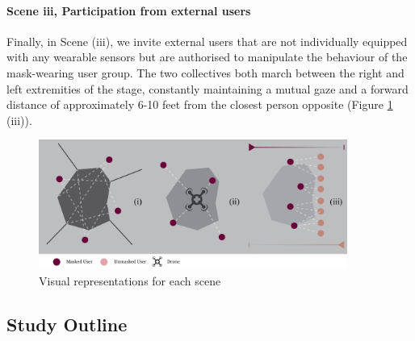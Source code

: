 \paragraph{Scene iii, Participation from external users}

Finally, in Scene (iii), we invite external users that are not individually equipped with any wearable sensors but are authorised to manipulate the behaviour of the mask-wearing user group. The two collectives both march between the right and left extremities of the stage, constantly maintaining a mutual gaze and a forward distance of approximately 6-10 feet from the closest person opposite (Figure \ref{fig1:structure} (iii)).

\begin{figure}[!h]
\centering
\includegraphics[width=0.9\textwidth,keepaspectratio]{Chapters/Figures/adse_ess/scenes_w_keycode.png}
{\caption{Visual representations for each scene}\label{fig1:structure}}
\end{figure}

\subsection{Study Outline}

